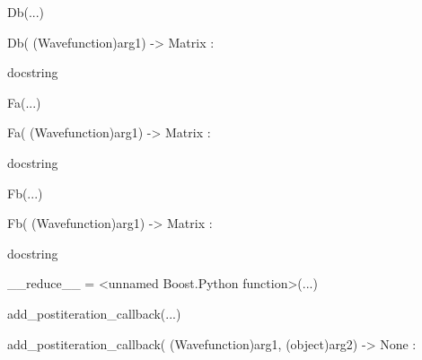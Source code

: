 \documentclass[letterpaper,10pt,english]{sphinxmanual}
\begin{document}
\begin{description}
\begin{description}
\begin{DUlineblock}{0em}
\begin{DUlineblock}{\DUlineblockindent}
\begin{DUlineblock}{\DUlineblockindent}
\item[] 
\end{DUlineblock}
\end{DUlineblock}
\item[] Db(...)
\item[]
\begin{DUlineblock}{\DUlineblockindent}
\item[] Db( (Wavefunction)arg1) -\textgreater{} Matrix :
\item[]
\begin{DUlineblock}{\DUlineblockindent}
\item[] docstring
\item[] 
\end{DUlineblock}
\end{DUlineblock}
\item[] Fa(...)
\item[]
\begin{DUlineblock}{\DUlineblockindent}
\item[] Fa( (Wavefunction)arg1) -\textgreater{} Matrix :
\item[]
\begin{DUlineblock}{\DUlineblockindent}
\item[] docstring
\item[] 
\end{DUlineblock}
\end{DUlineblock}
\item[] Fb(...)
\item[]
\begin{DUlineblock}{\DUlineblockindent}
\item[] Fb( (Wavefunction)arg1) -\textgreater{} Matrix :
\item[]
\begin{DUlineblock}{\DUlineblockindent}
\item[] docstring
\item[] 
\end{DUlineblock}
\end{DUlineblock}
\item[] \_\_reduce\_\_ = \textless{}unnamed Boost.Python function\textgreater{}(...)
\item[] 
\item[] add\_postiteration\_callback(...)
\item[]
\begin{DUlineblock}{\DUlineblockindent}
\item[] add\_postiteration\_callback( (Wavefunction)arg1, (object)arg2) -\textgreater{} None :
\item[]

\end{DUlineblock}
\end{DUlineblock}
\end{description}
\end{description}
\end{document}

